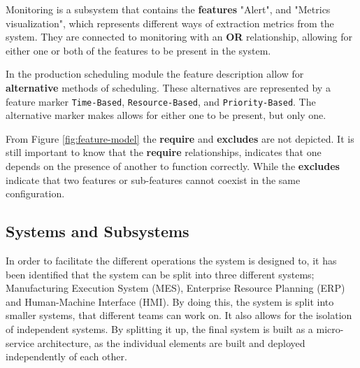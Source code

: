 Monitoring is a subsystem that contains the \textbf{features} "Alert", and "Metrics visualization", which represents different ways of extraction metrics from the system. They are connected to monitoring with an \textbf{OR} relationship, allowing for either one or both of the features to be present in the system.

In the production scheduling module the feature description allow for \textbf{alternative} methods of scheduling. These alternatives are represented by a feature marker \texttt{Time-Based}, \texttt{Resource-Based}, and \texttt{Priority-Based}. The alternative marker makes allows for either one to be present, but only one.

From Figure \ref{fig:feature-model} the \textbf{require} and \textbf{excludes} are not depicted. It is still important to know that the \textbf{require} relationships, indicates that one depends on the presence of another to function correctly. While the \textbf{excludes} indicate that two features or sub-features cannot coexist in the same configuration.





\subsection{Systems and Subsystems} %
\label{sec:systems-and-subsystems}

In order to facilitate the different operations the system is designed to, it has been identified that the system can be split into three different systems; Manufacturing Execution System (MES), Enterprise Resource Planning (ERP) and Human-Machine Interface (HMI). 
By doing this, the system is split into smaller systems, that different teams can work on. It also allows for the isolation of independent systems. 
By splitting it up, the final system is built as a micro-service architecture, as the individual elements are built and deployed independently of each other.

